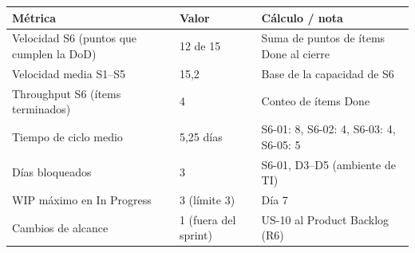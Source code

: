 \footnotesize
\begin{tabularx}{\linewidth}{l l X}
\toprule
\textbf{Métrica} & \textbf{Valor} & \textbf{Cálculo / nota} \\
\midrule
Velocidad S6 (puntos que cumplen la DoD) & 12 de 15 & Suma de puntos de ítems Done al cierre \\
Velocidad media S1--S5 & 15,2 & Base de la capacidad de S6 \\
Throughput S6 (ítems terminados) & 4 & Conteo de ítems Done \\
Tiempo de ciclo medio & 5,25 días & S6-01: 8, S6-02: 4, S6-03: 4, S6-05: 5 \\
Días bloqueados & 3 & S6-01, D3--D5 (ambiente de TI) \\
WIP máximo en In Progress & 3 (límite 3) & Día 7 \\
Cambios de alcance & 1 (fuera del sprint) & US-10 al Product Backlog (R6) \\
\bottomrule
\end{tabularx}
